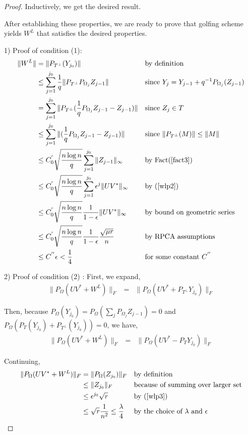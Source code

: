 \begin{proof}
Inductively, we get the desired result.

After establishing these properties, we are ready to prove that golfing scheme yields $W^{L}$ that satisfies the desired properties.

1) Proof of condition (1):
\[
\begin{aligned}
\|W^{L}\| & = \|P_{T^{\bot}}(Y_{j_{0}})\| && \text{by definition}\\
 & \le \sum_{j=1}^{j_{0}}\frac{1}{q}\|P_{T^{\bot}}P_{\Omega_{j}}Z_{j-1}\|
 &&\text{since } Y_{j} = Y_{j-1} + q^{-1} P_{\Omega_{j}}(Z_{j-1})\\
 & = \sum_{j=1}^{j_{0}}\|P_{T^{\bot}}(\frac{1}{q}P_{\Omega_{j}}Z_{j-1}-Z_{j-1})\|
 &&\text{since }Z_{j}\in T\\
 & \le \sum_{j=1}^{j_{0}}\|(\frac{1}{q}P_{\Omega_{j}}Z_{j-1}-Z_{j-1})\|
 &&\text{since }\|P_{T^{\bot}}(M)\|\le\|M\|\\
 & \le C_{0}^{'}\sqrt{\frac{n\log n}{q}}\sum_{j=1}^{j_{0}}\|Z_{j-1}\|_{\infty}
 &&\text{by Fact(\ref{fact3})}\\
 & \le C_{0}^{'}\sqrt{\frac{n\log n}{q}}\sum_{j=1}^{j_{0}}\epsilon^{j}\|UV^{*}\|_{\infty}
 &&\text{by (\ref{wlp2})}\\
 & \le C_{0}^{'}\sqrt{\frac{n\log n}{q}}\frac{1}{1-\epsilon}\|UV^{*}\|_{\infty}
 &&\text{by bound on geometric series}\\
 & \le C_{0}^{'}\sqrt{\frac{n\log n}{q}}\frac{1}{1-\epsilon}\frac{\sqrt{\mu r}}{n}
 &&\text{by RPCA assumptions}\\
 & \le C^{''}\epsilon<\frac{1}{4}
 &&\text{for some constant }C^{''}
\end{aligned}
\]

2) Proof of condition (2) : First, we expand,
\begin{eqnarray*}
\|P_{\Omega}(UV^{*}+W^{L})\|_{F} & = & \|P_{\Omega}(UV^{*}+P_{T^{\bot}}Y_{j_{0}})\|_{F}
\end{eqnarray*}

Then, because $P_{\Omega}(Y_{j_{0}})=P_{\Omega}(\sum_{j}P_{\Omega_{j}}Z_{j-1})=0$ and $P_{\Omega}(P_{T}(Y_{j_{0}})+P_{T^{\bot}}(Y_{j_{0}}))=0$, we have,
\begin{eqnarray*}
\|P_{\Omega}(UV^{*}+W^{L})\|_{F} & = & \|P_{\Omega}(UV^{*}-P_{T}Y_{j_{0}})\|_{F}
\end{eqnarray*}


Continuing,
\begin{align*}
\|P_{\Omega}(UV^{*}+W^{L})\|_{F}
& = \|P_{\Omega}(Z_{j_{0}})\|_{F}
&&\text{by definition}\\
& \le \|Z_{j_{0}}\|_{F}
&&\text{because of summing over larger set} \\
& \le \epsilon^{j_{0}} \sqrt{r}
&&\text{by (\ref{wlp3})} \\
& \le \sqrt{r}\frac{1}{n^{2}} \le \frac{\lambda}{4}
&&\text{by the choice of } \lambda \text{ and } \epsilon
\end{align*}



\end{proof}
